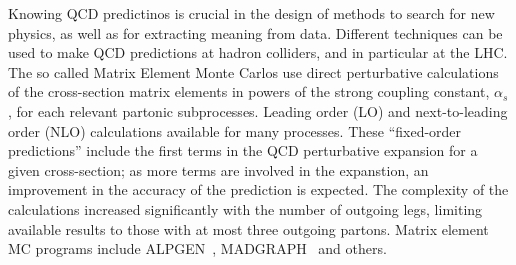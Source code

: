 Knowing QCD predictinos is crucial in the design of methods to search for new physics, as well as for extracting meaning from data. Different techniques can be used to make QCD predictions at hadron colliders, and in particular at the LHC. The so called Matrix Element Monte Carlos use direct perturbative calculations of the cross-section matrix elements in powers of the strong coupling constant, $\alpha_s$, for each relevant partonic subprocesses. Leading order (LO) and next-to-leading order (NLO) calculations available for many processes.   These ``fixed-order predictions'' include the first terms in the QCD perturbative expansion for a given cross-section; as more terms are involved in the expanstion, an improvement in the accuracy of the prediction is expected.  The complexity of the calculations increased significantly with the number of outgoing legs, limiting available results to those with at most three outgoing partons. Matrix element MC programs include ALPGEN~\cite{ALPGEN}, MADGRAPH~ and others.


